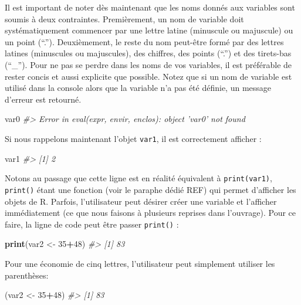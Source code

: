 \documentclass[]{article}
\newenvironment{Shaded}{\begin{snugshade}}{\end{snugshade}}
\newcommand{\CommentTok}[1]{\textcolor[rgb]{0.56,0.35,0.01}{\textit{#1}}}
\newcommand{\DecValTok}[1]{\textcolor[rgb]{0.00,0.00,0.81}{#1}}
\newcommand{\KeywordTok}[1]{\textcolor[rgb]{0.13,0.29,0.53}{\textbf{#1}}}
\newcommand{\NormalTok}[1]{#1}
\newcommand{\OperatorTok}[1]{\textcolor[rgb]{0.81,0.36,0.00}{\textbf{#1}}}
\newcommand{\StringTok}[1]{\textcolor[rgb]{0.31,0.60,0.02}{#1}}
\begin{document}
Il est important de noter dès maintenant que les noms donnés aux variables sont
soumis à deux contraintes. Premièrement, un nom de variable doit
systématiquement commencer par une lettre latine (minuscule ou majuscule) ou un
point (``.''). Deuxièmement, le reste du nom peut-être formé par des lettres
latines (minuscules ou majuscules), des chiffres, des points (``.'') et des
tirets-bas (``\_''). Pour ne pas se perdre dans les noms de vos variables, il est
préférable de rester concis et aussi explicite que possible. Notez que si un nom
de variable est utilisé dans la console alors que la variable n'a pas été
définie, un message d'erreur est retourné.

\begin{Shaded}
\begin{Highlighting}[]
\NormalTok{var0}
\CommentTok{#> Error in eval(expr, envir, enclos): object 'var0' not found}
\end{Highlighting}
\end{Shaded}

Si nous rappelons maintenant l'objet \texttt{var1}, il est correctement afficher :

\begin{Shaded}
\begin{Highlighting}[]
\NormalTok{var1}
\CommentTok{#> [1] 2}
\end{Highlighting}
\end{Shaded}

Notons au passage que cette ligne est en réalité équivalent à \texttt{print(var1)},
\texttt{print()} étant une fonction (voir le paraphe dédié REF) qui permet d'afficher les objets de R. Parfois,
l'utilisateur peut désirer créer une variable et l'afficher immédiatement (ce
que nous faisons à plusieurs reprises dans l'ouvrage). Pour ce faire, la ligne
de code peut être passer \texttt{print()} :

\begin{Shaded}
\begin{Highlighting}[]
\KeywordTok{print}\NormalTok{(var2 <-}\StringTok{ }\DecValTok{35}\OperatorTok{+}\DecValTok{48}\NormalTok{)}
\CommentTok{#> [1] 83}
\end{Highlighting}
\end{Shaded}

Pour une économie de cinq lettres, l'utilisateur peut simplement utiliser les
parenthèses:

\begin{Shaded}
\begin{Highlighting}[]
\NormalTok{(var2 <-}\StringTok{ }\DecValTok{35}\OperatorTok{+}\DecValTok{48}\NormalTok{)}
\CommentTok{#> [1] 83}
\end{Highlighting}
\end{Shaded}
\end{document}

